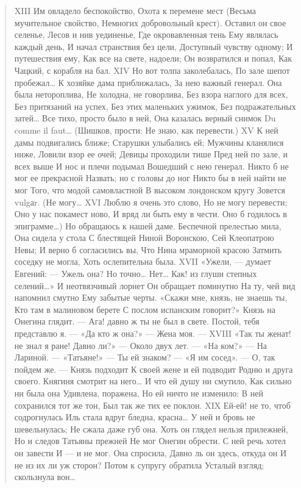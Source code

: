 \begin{verse}
XIII
Им овладело беспокойство,
Охота к перемене мест
(Весьма мучительное свойство,
Немногих добровольный крест).
Оставил он свое селенье,
Лесов и нив уединенье,
Где окровавленная тень
Ему являлась каждый день,
И начал странствия без цели,
Доступный чувству одному;
И путешествия ему,
Как все на свете, надоели;
Он возвратился и попал,
Как Чацкий, с корабля на бал.
XIV
Но вот толпа заколебалась,
По зале шепот пробежал…
К хозяйке дама приближалась,
За нею важный генерал.
Она была нетороплива,
Не холодна, не говорлива,
Без взора наглого для всех,
Без притязаний на успех,
Без этих маленьких ужимок,
Без подражательных затей…
Все тихо, просто было в ней,
Она казалась верный снимок
Du comme il faut… (Шишков, прости:
Не знаю, как перевести.)
XV
К ней дамы подвигались ближе;
Старушки улыбались ей;
Мужчины кланялися ниже,
Ловили взор ее очей;
Девицы проходили тише
Пред ней по зале, и всех выше
И нос и плечи подымал
Вошедший с нею генерал.
Никто б не мог ее прекрасной
Назвать; но с головы до ног
Никто бы в ней найти не мог
Того, что модой самовластной
В высоком лондонском кругу
Зовется vulgаr. (Не могу…
XVI
Люблю я очень это слово,
Но не могу перевести;
Оно у нас покамест ново,
И вряд ли быть ему в чести.
Оно б годилось в эпиграмме…)
Но обращаюсь к нашей даме.
Беспечной прелестью мила,
Она сидела у стола
С блестящей Ниной Воронскою,
Сей Клеопатрою Невы;
И верно б согласились вы,
Что Нина мраморной красою
Затмить соседку не могла,
Хоть ослепительна была.
XVII
«Ужели, — думает Евгений: —
Ужель она? Но точно… Нет…
Как! из глуши степных селений…»
И неотвязчивый лорнет
Он обращает поминутно
На ту, чей вид напомнил смутно
Ему забытые черты.
«Скажи мне, князь, не знаешь ты,
Кто там в малиновом берете
С послом испанским говорит?»
Князь на Онегина глядит.
— Ага! давно ж ты не был в свете.
Постой, тебя представлю я. —
«Да кто ж она?» — Жена моя. —
XVIII
«Так ты женат! не знал я ране!
Давно ли?» — Около двух лет. —
«На ком?» — На Лариной. — «Татьяне!»
— Ты ей знаком? — «Я им сосед».
— О, так пойдем же. — Князь подходит
К своей жене и ей подводит
Родню и друга своего.
Княгиня смотрит на него…
И что ей душу ни смутило,
Как сильно ни была она
Удивлена, поражена,
Но ей ничто не изменило:
В ней сохранился тот же тон,
Был так же тих ее поклон.
XIX
Ей-ей! не то, чтоб содрогнулась
Иль стала вдруг бледна, красна…
У ней и бровь не шевельнулась;
Не сжала даже губ она.
Хоть он глядел нельзя прилежней,
Но и следов Татьяны прежней
Не мог Онегин обрести.
С ней речь хотел он завести
И — и не мог. Она спросила,
Давно ль он здесь, откуда он
И не из их ли уж сторон?
Потом к супругу обратила
Усталый взгляд; скользнула вон…

\end{verse}
